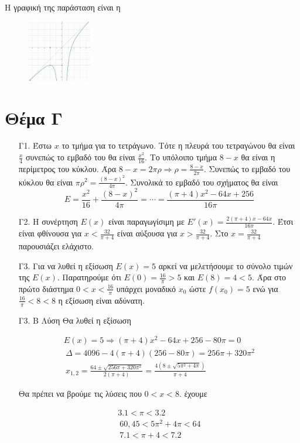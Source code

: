 \documentclass[12pt]{article}
\begin{document}
\begin{enumerate}
      Η γραφική της παράσταση είναι η

      \begin{figure}
        \includegraphics[width=0.25\textwidth]{2018PanelliniesΒ.png}
        \centering
      \end{figure}
  \end{enumerate}

  \section*{Θέμα Γ}
    \begin{enumerate}
      \item [Γ1.] Έστω $x$ το τμήμα για το τετράγωνο. Τότε η πλευρά του τετραγώνου θα είναι $\frac{x}{4}$ συνεπώς το εμβαδό του θα είναι $\frac{x^2}{16}$. Το υπόλοιπο τμήμα $8-x$ θα είναι η περίμετρος του κύκλου. Άρα $8-x=2πρ \Rightarrow ρ=\frac{8-x}{2π}$. Συνεπώς το εμβαδό του κύκλου θα είναι $πρ^2=\frac{(8-x)^2}{4π}$. Συνολικά το εμβαδό του σχήματος θα είναι
      $$Ε=\frac{x^2}{16}+\frac{(8-x)^2}{4π}=\cdots=\frac{(π+4)x^2-64x+256}{16π}$$


      \item [Γ2.] Η συνέρτηση $Ε(x)$ είναι παραγωγίσιμη με $Ε'(x)=\frac{2(π+4)x-64x}{16π}$. Έτσι είναι φθίνουσα για $x<\frac{32}{π+4}$ είναι αύξουσα για $x>\frac{32}{π+4}$. Στο $x=\frac{32}{π+4}$ παρουσιάζει ελάχιστο.

      \item [Γ3.] Για να λυθεί η εξίσωση $E(x)=5$ αρκεί να μελετήσουμε το σύνολο τιμών της $E(x)$. Παρατηρούμε ότι $E(0)=\frac{16}{π}>5$ και $E(8)=4<5$. Άρα στο πρώτο διάστημα $0<x<\frac{16}{π}$ υπάρχει μοναδικό $x_0$ ώστε $f(x_0)=5$ ενώ για $\frac{16}{π}<8<8$ η εξίσωση είναι αδύνατη.
      \item [Γ3.] Β Λύση Θα λυθεί η εξίσωση

    \begin{gather*}
      E(x)=5 \Rightarrow (π+4)x^2-64x+256-80π=0 \\\
      Δ=4096-4(π+4)(256-80π)=256π + 320π^2 \\\
      x_{1,2}=\frac{64\pm \sqrt{256π + 320π^2}}{2(π+4)}=\frac{4(8\pm \sqrt{5π^2+4π})}{π+4}
    \end{gather*}

    Θα πρέπει να βρούμε τις λύσεις που $0<x<8$. έχουμε

    \begin{gather*}
      3.1<π<3.2 \\\
      60,45<5π^2+4π<64 \\\
      7.1<π+4<7.2
    \end{gather*}


    \end{enumerate}
\end{document}
